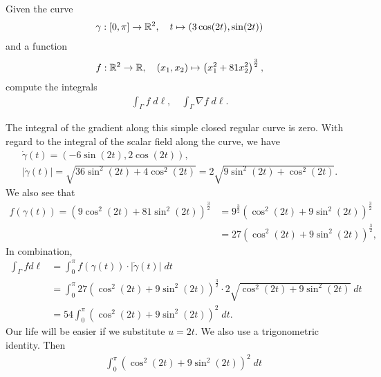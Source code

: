 \documentclass[11pt]{article}
\begin{document}
\begin{exercise}[Challenge?]
    Given the curve
    \begin{gather*}
        \gamma : [0,\pi] \to \mathbb{R}^2, \quad t \mapsto ( 3\cos(2t), \sin(2t) )
    \end{gather*}
    and a function
    \begin{gather*}
        f : \mathbb{R}^2 \to \mathbb{R}, \quad (x_1,x_2) \mapsto \left( x_1^2 + 81 x_2^2 \right)^{\frac 3 2},
    \end{gather*}
    compute the integrals 
    \begin{align*}
        \int_\Gamma f \;d\ell, \quad \int_\Gamma \nabla f \;d\ell.
    \end{align*}
\end{exercise}
\begin{solution}     
    The integral of the gradient along this simple closed regular curve is zero.
    With regard to the integral of the scalar field along the curve, we have 
    \begin{gather*}
        \dot\gamma(t) = \left( -6 \sin(2t), 2\cos(2t) \right),
        \\ 
        |\dot\gamma(t)| 
        = 
        \sqrt{ 36 \sin^2(2t) + 4 \cos^2(2t) }
        = 
        2 \sqrt{ 9 \sin^2(2t) + \cos^2(2t) }
        .
    \end{gather*}
    We also see that 
    \begin{align*}
        f(\gamma(t))
        =
        \left( 9\cos^2(2t) + 81 \sin^2(2t) \right)^{\frac 3 2}
        &=
        9^{\frac 3 2 }   \left( \cos^2(2t) + 9 \sin^2(2t) \right)^{\frac 3 2}
        \\&=
        27 \left( \cos^2(2t) + 9 \sin^2(2t) \right)^{\frac 3 2}
        ,
    \end{align*}
    In combination, 
    \begin{align*}
       \int_\Gamma f d\ell
       &=
       \int_0^{\pi} f(\gamma(t)) \cdot |\dot\gamma(t)| \;dt
       \\&=
       \int_0^{\pi} 27 \left( \cos^2(2t) + 9\sin^2(2t) \right)^{\frac 3 2} \cdot 2\sqrt{ \cos^2(2t) + 9\sin^2(2t) } \;dt
       \\&=
       54 \int_0^{\pi} \left( \cos^2(2t) + 9 \sin^2(2t) \right)^{2} \;dt
       .
    \end{align*}
    Our life will be easier if we substitute $u = 2t$. We also use a trigonometric identity. Then
    \begin{align*}
        &
        \int_0^{\pi} \left( \cos^2(2t) + 9 \sin^2(2t) \right)^{2} \;dt

\end{align*}
\end{solution}
\end{document}
